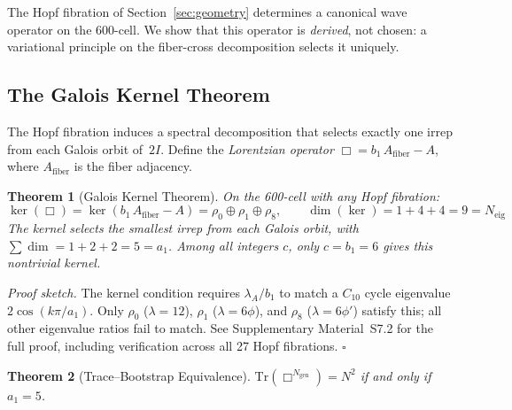 \documentclass[12pt,a4paper]{article}
\newtheorem{theorem}{Theorem}
\theoremstyle{definition}
\begin{document}
The Hopf fibration of Section~\ref{sec:geometry} determines a canonical wave operator on the 600-cell.  We show that this operator is \emph{derived}, not chosen: a variational principle on the fiber-cross decomposition selects it uniquely.

\subsection{The Galois Kernel Theorem}
\label{sec:galois_kernel}

The Hopf fibration induces a spectral decomposition that selects exactly one irrep from each Galois orbit of~$2I$.  Define the \emph{Lorentzian operator} $\Box = b_1 \, A_{\text{fiber}} - A$, where $A_{\text{fiber}}$ is the fiber adjacency.

\begin{theorem}[Galois Kernel Theorem]\label{thm:galois_kernel}
On the 600-cell with any Hopf fibration:
\begin{equation}
\ker(\Box) = \ker(b_1\,A_{\mathrm{fiber}} - A) = \rho_0 \oplus \rho_1 \oplus \rho_8, \qquad
\dim(\ker) = 1 + 4 + 4 = 9 = N_{\mathrm{eig}}
\label{eq:galois_kernel}
\end{equation}
The kernel selects the smallest irrep from each Galois orbit, with $\sum \dim = 1+2+2 = 5 = a_1$.  Among all integers $c$, only $c = b_1 = 6$ gives this nontrivial kernel.
\end{theorem}

\noindent\textit{Proof sketch.}  The kernel condition requires $\lambda_A/b_1$ to match a $C_{10}$ cycle eigenvalue $2\cos(k\pi/a_1)$.  Only $\rho_0$ ($\lambda = 12$), $\rho_1$ ($\lambda = 6\phi$), and $\rho_8$ ($\lambda = 6\phi'$) satisfy this; all other eigenvalue ratios fail to match.  See Supplementary Material~S7.2 for the full proof, including verification across all 27 Hopf fibrations.  \hfill$\square$

\begin{theorem}[Trace--Bootstrap Equivalence]\label{thm:trace_bootstrap}
$\mathrm{Tr}(\Box^{N_{\mathrm{gen}}}) = N^2$ if and only if $a_1 = 5$.
\end{theorem}
\end{document}
